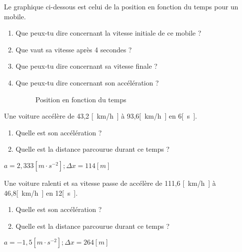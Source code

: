 \begin{exercise}
  Le graphique ci-dessous est celui de la position en fonction du temps pour un mobile.
  \begin{enumerate}[label=\alph*)]
    \item Que peux-tu dire concernant la vitesse initiale de ce mobile ?
    \item Que vaut sa vitesse après 4 secondes ?
    \item Que peux-tu dire concernant sa vitesse finale ?
    \item Que peux-tu dire concernant son accélération ?
          \begin{figure}[h!]
            \centering
            \caption{Position en fonction du temps}
            \label{Position en fonction du temps}
          \end{figure}
  \end{enumerate}
\end{exercise}

\begin{exercise}
  Une voiture accélère de 43,2 \unit{[km/h]} à 93,6\unit{[km/h]} en 6\unit{[s]}.
  \begin{enumerate}[label=\alph*)]
    \item Quelle est son accélération ?
    \item Quelle est la distance parcourue durant ce temps ?
  \end{enumerate}
\end{exercise}
\begin{solution}
  \(a=2,333\unit{[m \cdot s^{-2}]} ; \Delta x=114[m] \)
\end{solution}


\begin{exercise}
  Une voiture ralenti et sa vitesse passe de accélère de 111,6 \unit{[km/h]} à 46,8\unit{[km/h]} en 12\unit{[s]}.
  \begin{enumerate}[label=\alph*)]
    \item Quelle est son accélération ?
    \item Quelle est la distance parcourue durant ce temps ?
  \end{enumerate}
\end{exercise}
\begin{solution}
  \(a=-1,5\unit{[m \cdot s^{-2}]} ; \Delta x=264[m]\)
\end{solution}

